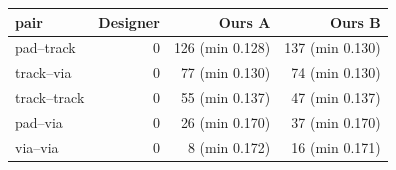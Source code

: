\begin{tabular}{lrrr}
\toprule
pair & Designer & Ours A & Ours B \\
\midrule
pad--track & 0 & 126 (min 0.128) & 137 (min 0.130) \\
track--via & 0 & 77 (min 0.130) & 74 (min 0.130) \\
track--track & 0 & 55 (min 0.137) & 47 (min 0.137) \\
pad--via & 0 & 26 (min 0.170) & 37 (min 0.170) \\
via--via & 0 & 8 (min 0.172) & 16 (min 0.171) \\
\bottomrule
\end{tabular}
